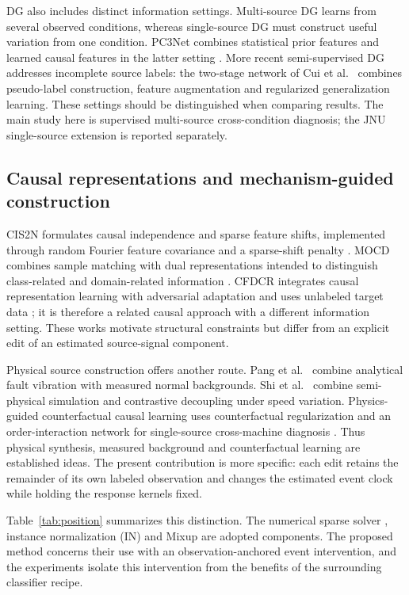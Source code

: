 \documentclass[a4paper,fleqn]{cas-sc}
\begin{document}
DG also includes distinct information settings. Multi-source DG learns from several observed conditions, whereas single-source DG must construct useful variation from one condition. PC3Net combines statistical prior features and learned causal features in the latter setting \cite{pc3net}. More recent semi-supervised DG addresses incomplete source labels: the two-stage network of Cui et al.~\cite{cui2026} combines pseudo-label construction, feature augmentation and regularized generalization learning. These settings should be distinguished when comparing results. The main study here is supervised multi-source cross-condition diagnosis; the JNU single-source extension is reported separately.

\subsection{Causal representations and mechanism-guided construction}
CIS2N formulates causal independence and sparse feature shifts, implemented through random Fourier feature covariance and a sparse-shift penalty \cite{cis2n}. MOCD combines sample matching with dual representations intended to distinguish class-related and domain-related information \cite{mocd}. CFDCR integrates causal representation learning with adversarial adaptation and uses unlabeled target data \cite{cfdcr}; it is therefore a related causal approach with a different information setting. These works motivate structural constraints but differ from an explicit edit of an estimated source-signal component.

Physical source construction offers another route. Pang et al.~\cite{pang2024} combine analytical fault vibration with measured normal backgrounds. Shi et al.~\cite{shi2024} combine semi-physical simulation and contrastive decoupling under speed variation. Physics-guided counterfactual causal learning uses counterfactual regularization and an order-interaction network for single-source cross-machine diagnosis \cite{pcr2026}. Thus physical synthesis, measured background and counterfactual learning are established ideas. The present contribution is more specific: each edit retains the remainder of its own labeled observation and changes the estimated event clock while holding the response kernels fixed.


Table~\ref{tab:position} summarizes this distinction. The numerical sparse solver \cite{fista}, instance normalization (IN) \cite{in} and Mixup \cite{mixup} are adopted components. The proposed method concerns their use with an observation-anchored event intervention, and the experiments isolate this intervention from the benefits of the surrounding classifier recipe.
\end{document}

